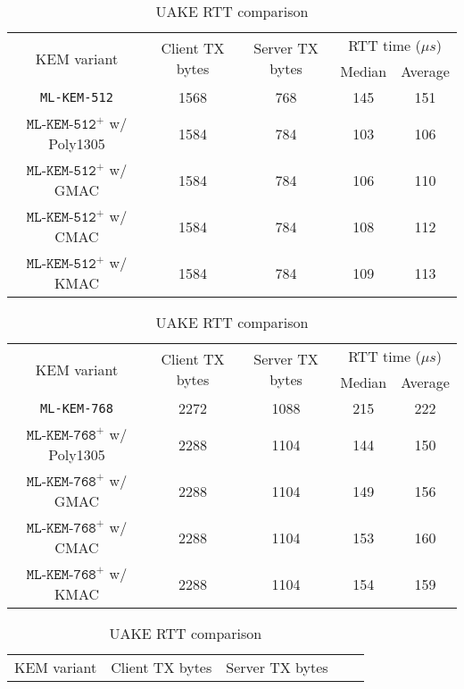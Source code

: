 \documentclass[journal=tches,submission]{iacrtrans}
\newcommand{\us}{\mu s}
\begin{document}
\begin{table}[H]
    \centering
    \small
    \caption{UAKE RTT comparison}\label{tbl:uake-rtt}
    \begin{tabular}{|c|c|c|c|c|}
        \hline
        \multirow{2}{*}{KEM variant}
        & \multirow{2}{*}{Client TX bytes}
        & \multirow{2}{*}{Server TX bytes}
        & \multicolumn{2}{|c|}{RTT time ($\us$)} \\
        \cline{4-5}
        & & & Median & Average \\
        \hline
        \texttt{ML-KEM-512} & 1568 & 768 & 145 & 151 \\
        \hline
        $\texttt{ML-KEM-512}^+$ w/ Poly1305 & 1584 & 784 & 103 & 106 \\
        \hline
        $\texttt{ML-KEM-512}^+$ w/ GMAC & 1584 & 784 & 106 & 110 \\
        \hline
        $\texttt{ML-KEM-512}^+$ w/ CMAC & 1584 & 784 & 108 & 112 \\
        \hline
        $\texttt{ML-KEM-512}^+$ w/ KMAC & 1584 & 784 & 109 & 113 \\
        \hline
    \end{tabular}\vspace{0.3cm}
    \begin{tabular}{|c|c|c|c|c|}
        \hline
        \multirow{2}{*}{KEM variant}
        & \multirow{2}{*}{Client TX bytes}
        & \multirow{2}{*}{Server TX bytes}
        & \multicolumn{2}{|c|}{RTT time ($\us$)} \\
        \cline{4-5}
        & & & Median & Average \\
        \hline
        \texttt{ML-KEM-768} & 2272 & 1088 & 215 & 222 \\
        \hline
        $\texttt{ML-KEM-768}^+$ w/ Poly1305 & 2288 & 1104 & 144 & 150 \\
        \hline
        $\texttt{ML-KEM-768}^+$ w/ GMAC & 2288 & 1104 & 149 & 156 \\
        \hline
        $\texttt{ML-KEM-768}^+$ w/ CMAC & 2288 & 1104 & 153 & 160 \\
        \hline
        $\texttt{ML-KEM-768}^+$ w/ KMAC & 2288 & 1104 & 154 & 159 \\
        \hline
    \end{tabular}\vspace{0.3cm}
    \begin{tabular}{|c|c|c|c|c|}
        \hline
        \multirow{2}{*}{KEM variant}
        & \multirow{2}{*}{Client TX bytes}
        & \multirow{2}{*}{Server TX bytes}

\end{tabular}
\end{table}
\end{document}

